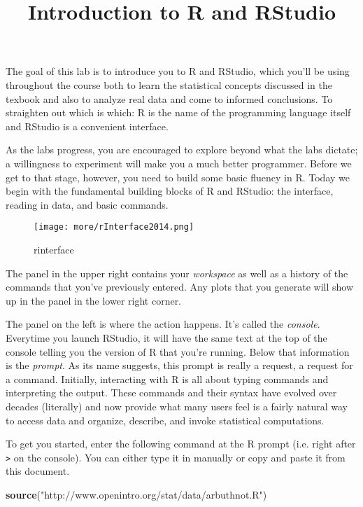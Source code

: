 \documentclass[
]{article}
\title{Introduction to R and RStudio}
\author{}
\date{\vspace{-2.5em}}
\newenvironment{Shaded}{\begin{snugshade}}{\end{snugshade}}
\newcommand{\KeywordTok}[1]{\textcolor[rgb]{0.13,0.29,0.53}{\textbf{#1}}}
\newcommand{\NormalTok}[1]{#1}
\newcommand{\StringTok}[1]{\textcolor[rgb]{0.31,0.60,0.02}{#1}}
\begin{document}
\maketitle

The goal of this lab is to introduce you to R and RStudio, which you'll
be using throughout the course both to learn the statistical concepts
discussed in the texbook and also to analyze real data and come to
informed conclusions. To straighten out which is which: R is the name of
the programming language itself and RStudio is a convenient interface.

As the labs progress, you are encouraged to explore beyond what the labs
dictate; a willingness to experiment will make you a much better
programmer. Before we get to that stage, however, you need to build some
basic fluency in R. Today we begin with the fundamental building blocks
of R and RStudio: the interface, reading in data, and basic commands.

\begin{figure}
\centering
\texttt{[image: more/rInterface2014.png]}
\caption{rinterface}
\end{figure}

The panel in the upper right contains your \emph{workspace} as well as a
history of the commands that you've previously entered. Any plots that
you generate will show up in the panel in the lower right corner.

The panel on the left is where the action happens. It's called the
\emph{console}. Everytime you launch RStudio, it will have the same text
at the top of the console telling you the version of R that you're
running. Below that information is the \emph{prompt}. As its name
suggests, this prompt is really a request, a request for a command.
Initially, interacting with R is all about typing commands and
interpreting the output. These commands and their syntax have evolved
over decades (literally) and now provide what many users feel is a
fairly natural way to access data and organize, describe, and invoke
statistical computations.

To get you started, enter the following command at the R prompt (i.e.
right after \texttt{\textgreater{}} on the console). You can either type
it in manually or copy and paste it from this document.

\begin{Shaded}
\begin{Highlighting}[]
\KeywordTok{source}\NormalTok{(}\StringTok{"http://www.openintro.org/stat/data/arbuthnot.R"}\NormalTok{)}
\end{Highlighting}
\end{Shaded}
\end{document}
